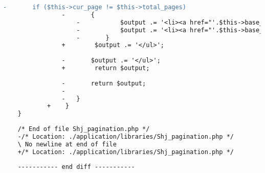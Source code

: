 \begin{lstlisting}[language=diff, caption=Perubahan pada kode Shj\_pagination.php]
				-		if ($this->cur_page != $this->total_pages)
				-		{
					-			$output .= '<li><a href="'.$this->base_url.'/page/'.($this->cur_page+1).'">&rsaquo;</a></li>';
					-			$output .= '<li><a href="'.$this->base_url.'/page/'.$this->total_pages.'">Last ('.$this->total_pages.') &rsaquo;</a></li>';
					-		}
				+        $output .= '</ul>';
				
				-		$output .= '</ul>';
				+        return $output;
				
				-		return $output;
				-
				-	}
			+    }
	}
	
	/* End of file Shj_pagination.php */
	-/* Location: ./application/libraries/Shj_pagination.php */
	\ No newline at end of file
	+/* Location: ./application/libraries/Shj_pagination.php */
	
	----------- end diff -----------
\end{lstlisting}


